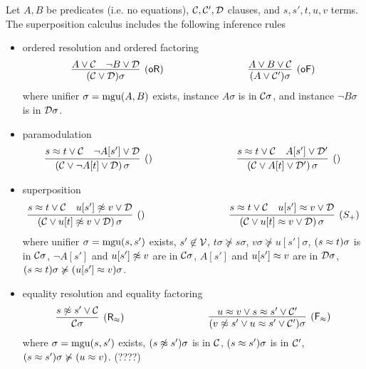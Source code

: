 
\begin{definition}\label{def:superposition-calculus}
	Let $A,B$ be predicates (i.e. no equations),
	${\mathcal C},{\mathcal C}',{\mathcal D}$ clauses, and $s,s', t,u,v$ terms.
	The {\myem superposition calculus} includes the following inference rules
	\begin{itemize}
		\item ordered resolution and ordered factoring
		\begin{gather*}
		\infer
		[\mathsf{(oR)}]
		{(\mcC \lor \mcD)\sigma}
		{{ A} \lor\mcC & { \lnot B} \lor\mcD}
		\hspace{3cm}
		\infer
		[\mathsf{(oF)}]
		{(A \lor \mcC')\sigma}
		{{ A}\lor B\lor\mcC}
		\end{gather*}
		where unifier $\sigma=\operatorname{mgu}(A,B)$ exists, 
		instance $A\sigma$ is \txtSTRICTLY in ${\mathcal C}\sigma$,
		and	instance $\lnot B\sigma$ is \txtMAXIMAL in ${\mathcal D}\sigma$.
		\item paramodulation
		\begin{gather*}
		\infer
		[\mathsf{()}]
		{(\mcC\lor \lnot A[t]\lor\mcD)\,\sigma}
		{{ s\mEQ t} \lor\mcC\quad { \lnot A[s']}\lor\mcD}
		\hspace{3cm}
		\infer
		[\mathsf{()}]
		{(\mcC\lor A[t]\lor\mcD')\,\sigma}
		{{ s\mEQ t} \lor\mcC\quad { A[s']}\lor\mcD'}
\end{gather*}
\item superposition
\begin{gather*}
		\infer
		[()]
		{(\mcC\lor u[t]\mNE v\lor\mcD)\,\sigma}
		{{ s\mEQ t}\lor\mcC\quad { u[s']\mNE v}\lor\mcD}
		\hspace{3cm}
		\infer
		[(S_+)]
		{(\mcC\lor u[t]\mEQ v\lor\mcD)\,\sigma}
		{{ s\mEQ t}\lor\mcC\quad { u[s']\mEQ v}\lor\mcD}
		\end{gather*}
		where unifier $\sigma=\operatorname{mgu}(s,s')$ exists,
		$s'\not\in{\mathcal V}$,
		$t\sigma\not\succcurlyeq s\sigma$,
		$v\sigma\not\succcurlyeq u[s']\sigma$,
		$(s\approx t)\sigma$ is \txtSTRICTLY in ${\mathcal C}\sigma$,
		$\lnot A[s']$ and $u[s']\not\approx v$ are \txtMAXIMAL in ${\mathcal C}\sigma$,
		$A[s']$ and $u[s']\approx v$ are \txtSTRICTLY in ${\mathcal D}\sigma$,
		$(s\approx t)\sigma\not\succcurlyeq(u[s']\approx v)\sigma$. 
		\item 
		equality resolution and equality factoring
		\[
		\infer
		[\mathsf{(R_\mEQ)}]
		{\mcC\sigma}
		{{s\mNE s'}\lor\mcC}
		\hspace{3cm}
		\infer
		[\mathsf{(F_\mEQ)}]
		{(v\mNE s'\lor u\mEQ s'\lor\mcC')\sigma}
		{{ u\mEQ v}\lor{s\mEQ s'}\lor\mcC'}
		\]
		where 
		$\sigma=\operatorname{mgu}(s,s')$ exists,
		$(s\not\approx s')\sigma$ is \txtMAXIMAL in ${\mathcal C}$,
		$(s\approx s')\sigma$ is \txtSTRICTLY in ${\mathcal C}'$,
		$(s\approx s')\sigma\not\succcurlyeq(u\approx v)$. (????) 
	\end{itemize}
\end{definition}
